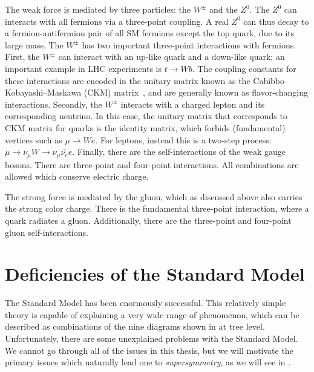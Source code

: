 The weak force is mediated by three particles: the $W^\pm$ and the $Z^0$.
The $Z^0$ can interacts with all fermions via a three-point coupling.
A real $Z^0$ can thus decay to a fermion-antifermion pair of all SM fermions except the top quark, due to its large mass.
The $W^\pm$ has two important three-point interactions with fermions.
First, the $W^\pm$ can interact with an up-like quark and a down-like quark; an important example in LHC experiments is $t \rightarrow Wb$.
The coupling constants for these interactions are encoded in the unitary matrix known as the Cabibbo–Kobayashi–Maskawa (CKM) matrix~\cite{Cabibbo:1963yz,Kobayashi:1973fv}, and are generally known as flavor-changing interactions.
Secondly, the $W^\pm$ interacts with a charged lepton and its corresponding neutrino.
In this case, the unitary matrix that corresponds to CKM matrix for quarks is the identity matrix, which forbids (fundamental) vertices such as $\mu \rightarrow We$.
For leptons, instead this is a two-step process: $\mu \rightarrow \nu_{\mu} W \rightarrow \nu_{\mu} \bar{\nu_e} e$.
Finally, there are the self-interactions of the weak gauge bosons.
There are three-point and four-point interactions.
All combinations are allowed which conserve electric charge.

The strong force is mediated by the gluon, which as discussed above also carries the strong color charge.
There is the fundamental three-point interaction, where a quark radiates a gluon.
Additionally, there are the three-point and four-point gluon self-interactions.

\section{Deficiencies of the Standard Model}
\label{sec:def_sm}

The Standard Model has been enormously successful.
This relatively simple theory is capable of explaining a very wide range of phenomenon, which can be described as combinations of the nine diagrams shown in  at tree level.
Unfortunately, there are some unexplained problems with the Standard Model.
We cannot go through all of the issues in this thesis, but we will motivate the primary issues which naturally lead one to \textit{supersymmetry}, as we will see in .


